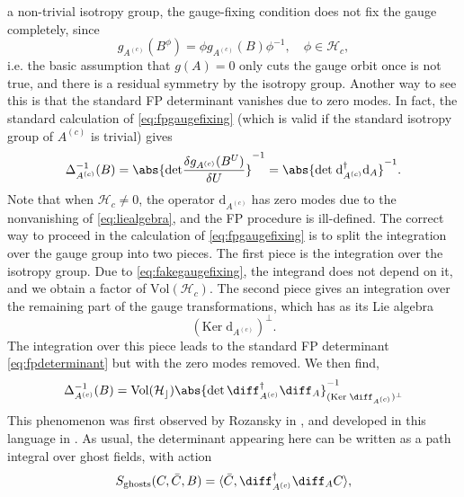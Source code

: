 a non-trivial isotropy group, the gauge-fixing condition does not fix
the gauge completely, since
\begin{equation}
  g_{A^{(c)}}(B^\phi) = \phi g_{A^{(c)}}(B)\phi^{-1},\quad
  \phi\in\mathcal{H}_c,
  \label{eq:fakegaugefixing}
\end{equation}
i.e. the basic assumption that $g(A)=0$ only cuts the gauge orbit
once is not true, and there is a residual symmetry by the isotropy
group. Another way to see this is that the standard FP determinant
vanishes due to zero modes. In fact, the standard calculation of
\eqref{eq:fpgaugefixing} (which is valid if the standard isotropy
group of $A^{(c)}$ is trivial) gives
\begin{equation}
  \Delta^{-1}_{A^{(c)}}(B) = \abs{\mathrm{det}\frac{\delta
      g_{A^{(c)}}(B^U)}{\delta U}}^{-1}
      = \abs{\mathrm{det}\;\mathrm{d}^\dagger_{A^{(c)}}\mathrm{d}_A}^{-1}.
      \label{eq:fpdeterminant}
    \end{equation}
Note that when $\mathcal{H}_c\neq 0$, the operator $\mathrm{d}_{A^{(c)}}$ has
zero modes due to the nonvanishing of \eqref{eq:liealgebra}, and the FP
procedure is ill-defined. The correct way to proceed in the calculation of
\eqref{eq:fpgaugefixing} is to split the integration over the
gauge group into two pieces. The first piece is the integration
over the isotropy group. Due to \eqref{eq:fakegaugefixing}, the integrand does
not depend on it, and we obtain a factor of $\mathrm{Vol}(\mathcal{H}_c)$. The
second piece gives an integration over the remaining part of the gauge
transformations, which has as its Lie algebra
\begin{equation}
  \left(\mathrm{Ker}\;\mathrm{d}_{A^{(c)}}\right)^\bot .
\end{equation}
The integration over this piece leads to the standard FP determinant
\eqref{eq:fpdeterminant} but with the zero modes removed. We then
find,
\begin{equation}
  \Delta^{-1}_{A^{(c)}}(B)
  = \mathrm{Vol}(\mathcal{H_c})\abs{\det\diff^\dagger_{A^{(c)}}\diff_A}^{-1}_{(\mathrm{Ker}\;\diff_{A^{(c)}})^\bot}
\end{equation}
This phenomenon was first observed by Rozansky in \cite{Rozansky94}, and
developed in this language in \cite{Adams97}. As usual, the determinant
appearing here can be written as a path integral over ghost fields,
with action
\begin{equation}
  S_{\mathrm{ghosts}}(C,\bar{C},B) = \langle
  \bar{C},\diff^\dagger_{A^{(c)}}\diff_A C\rangle,
\end{equation}

